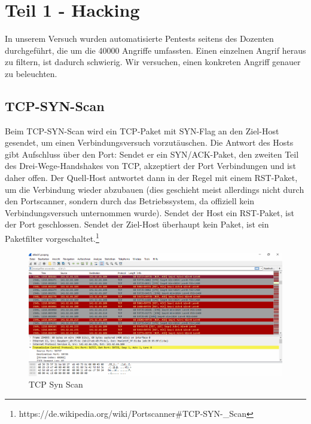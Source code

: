 \documentclass[a4paper]{report}
\begin{document}
\section{Teil 1 - Hacking}
In unserem Versuch wurden automatisierte Pentests seitens des Dozenten durchgeführt, die um die 40000 Angriffe umfassten. Einen einzelnen Angrif heraus zu filtern, ist dadurch schwierig. Wir versuchen, einen konkreten Angriff genauer zu beleuchten.

\subsection{TCP-SYN-Scan}
Beim TCP-SYN-Scan wird ein TCP-Paket mit SYN-Flag an den Ziel-Host gesendet, um einen Verbindungsversuch vorzutäuschen. Die Antwort des Hosts gibt Aufschluss über den Port: Sendet er ein SYN/ACK-Paket, den zweiten Teil des Drei-Wege-Handshakes von TCP, akzeptiert der Port Verbindungen und ist daher offen. Der Quell-Host antwortet dann in der Regel mit einem RST-Paket, um die Verbindung wieder abzubauen (dies geschieht meist allerdings nicht durch den Portscanner, sondern durch das Betriebssystem, da offiziell kein Verbindungsversuch unternommen wurde). Sendet der Host ein RST-Paket, ist der Port geschlossen. Sendet der Ziel-Host überhaupt kein Paket, ist ein Paketfilter vorgeschaltet.\footnote{https://de.wikipedia.org/wiki/Portscanner\#TCP-SYN-\_Scan}

\begin{figure}[htb]
	\centering
	\includegraphics[width=1.0\textwidth]{pics/latex/tcpsynscan.png}
	\caption{TCP Syn Scan}
	\label{fig:tcpsynscan}
\end{figure}
\end{document}

